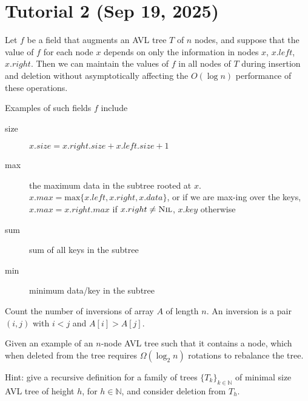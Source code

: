 \section{Tutorial 2 (Sep 19, 2025)}

\begin{simplethm}
    Let $f$ be a field that augments an AVL tree $T$ of $n$ nodes, and suppose that the value of $f$ for each node $x$ depends on only the information in nodes $x$, $x.left$, $x.right$. Then we can maintain the values of $f$ in all nodes of $T$ during insertion and deletion without asymptotically affecting the $O(\log n)$ performance of these operations. 
\end{simplethm}

\noindent Examples of such fields $f$ include
\begin{description}
    \item[size] $x.size = x.right.size + x.left.size + 1$
    \item[max] the maximum data in the subtree rooted at $x$. $x.max = \text{max}\{ x.left, x.right, x.data \}$, or if we are max-ing over the keys, $x.max = x.right.max$ if $x.right \ne \textsc{Nil}$, $x.key$ otherwise
    \item[sum] sum of all keys in the subtree
    \item[min] minimum data/key in the subtree
\end{description}

\begin{problem}
    Count the number of inversions of array $A$ of length $n$. An inversion is a pair $(i, j)$ with $i < j$ and $A[i] > A[j]$. 
\end{problem}

\begin{problem}
    Given an example of an $n$-node AVL tree such that it contains a node, which when deleted from the tree requires $\Omega(\log_2 n)$ rotations to rebalance the tree. 
\end{problem}

Hint: give a recursive definition for a family of trees $\{ T_k \}_{k \in \mathbb{N}}$ of minimal size AVL tree of height $h$, for $h \in \mathbb{N}$, and consider deletion from $T_h$.
